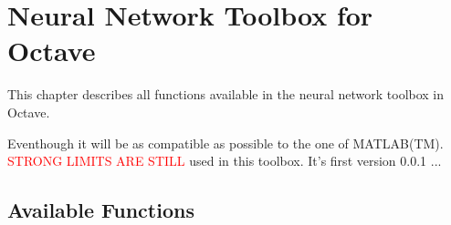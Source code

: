 \chapter{Neural Network Toolbox for Octave}
This chapter describes all functions available in the neural network toolbox in Octave.

Eventhough it will be as compatible as possible to the one of MATLAB(TM). \textcolor{red}{STRONG LIMITS ARE STILL} used in this toolbox. It's first version 0.0.1 ...

\section{Available Functions}





